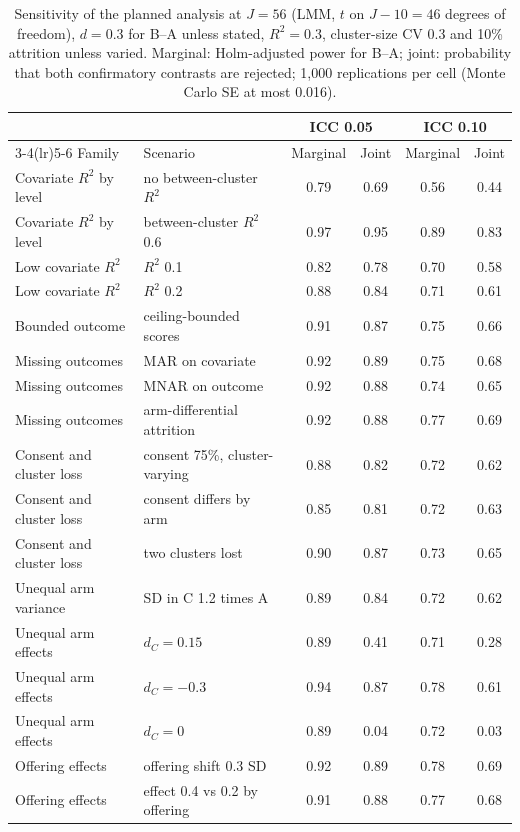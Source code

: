 \begin{table}[t]
\caption{Sensitivity of the planned analysis at $J=56$ (LMM, $t$ on $J-10=46$ degrees of freedom), $d=0.3$ for B--A unless stated, $R^2=0.3$, cluster-size CV 0.3 and 10\% attrition unless varied. Marginal: Holm-adjusted power for B--A; joint: probability that both confirmatory contrasts are rejected; 1,000 replications per cell (Monte Carlo SE at most 0.016).}
\label{tab:sensitivity}
\footnotesize
\setlength{\tabcolsep}{3.5pt}
\begin{tabular}{llcccc}
\toprule
& & \multicolumn{2}{c}{ICC 0.05} & \multicolumn{2}{c}{ICC 0.10}\\
\cmidrule(lr){3-4}\cmidrule(lr){5-6}
Family & Scenario & Marginal & Joint & Marginal & Joint\\
\midrule
Covariate $R^2$ by level & no between-cluster $R^2$ & 0.79 & 0.69 & 0.56 & 0.44\\
Covariate $R^2$ by level & between-cluster $R^2$ 0.6 & 0.97 & 0.95 & 0.89 & 0.83\\
Low covariate $R^2$ & $R^2$ 0.1 & 0.82 & 0.78 & 0.70 & 0.58\\
Low covariate $R^2$ & $R^2$ 0.2 & 0.88 & 0.84 & 0.71 & 0.61\\
Bounded outcome & ceiling-bounded scores & 0.91 & 0.87 & 0.75 & 0.66\\
Missing outcomes & MAR on covariate & 0.92 & 0.89 & 0.75 & 0.68\\
Missing outcomes & MNAR on outcome & 0.92 & 0.88 & 0.74 & 0.65\\
Missing outcomes & arm-differential attrition & 0.92 & 0.88 & 0.77 & 0.69\\
Consent and cluster loss & consent 75\%, cluster-varying & 0.88 & 0.82 & 0.72 & 0.62\\
Consent and cluster loss & consent differs by arm & 0.85 & 0.81 & 0.72 & 0.63\\
Consent and cluster loss & two clusters lost & 0.90 & 0.87 & 0.73 & 0.65\\
Unequal arm variance & SD in C 1.2 times A & 0.89 & 0.84 & 0.72 & 0.62\\
Unequal arm effects & $d_C=0.15$ & 0.89 & 0.41 & 0.71 & 0.28\\
Unequal arm effects & $d_C=-0.3$ & 0.94 & 0.87 & 0.78 & 0.61\\
Unequal arm effects & $d_C=0$ & 0.89 & 0.04 & 0.72 & 0.03\\
Offering effects & offering shift 0.3 SD & 0.92 & 0.89 & 0.78 & 0.69\\
Offering effects & effect 0.4 vs 0.2 by offering & 0.91 & 0.88 & 0.77 & 0.68\\

\end{tabular}
\end{table}
